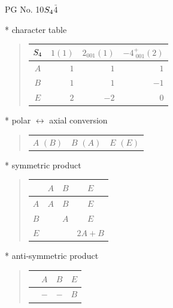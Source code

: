 \documentclass[fleqn,8pt,landscape]{jsarticle}
\begin{document}
\setcounter{MaxMatrixCols}{32}

\renewcommand{\tablename}{Table~}
\renewcommand{\figurename}{Figure~}
\begin{center}
\LARGE
PG No. 10\quad$S_{\rm 4}$\quad$\bar{4}$\quad[ tetragonal ]
\end{center}

* character table
\begin{quote}
\begin{tabular}{crrr} \hline \hline
$ S_{\rm 4} $ & $ 1(1) $ & $ 2{}_{001}(1) $ & $ -4^{+}_{\,\,001}(2) $ \\ \hline
$ A $ & $ 1 $ & $ 1 $ & $ 1 $ \\
$ B $ & $ 1 $ & $ 1 $ & $ -1 $ \\
$ E $ & $ 2 $ & $ -2 $ & $ 0 $ \\
 \hline \hline
\end{tabular}
\end{quote}

* polar $\leftrightarrow$ axial conversion
\begin{quote}
\begin{tabular}{ccc}
$ A\,\,(B) $ & $ B\,\,(A) $ & $ E\,\,(E) $
\end{tabular}
\end{quote}

* symmetric product
\begin{quote}
\begin{tabular}{c|ccc} \hline \hline
 & $ A $ & $ B $ & $ E $ \\ \hline
$ A $ & $ A $ & $ B $ & $ E $ \\
$ B $ & $  $ & $ A $ & $ E $ \\
$ E $ & $  $ & $  $ & $ 2 A + B $ \\
 \hline \hline
\end{tabular}
\end{quote}

* anti-symmetric product
\begin{quote}
\begin{tabular}{cccc} \hline \hline
 & $ A $ & $ B $ & $ E $ \\ \hline
$  $ & $ - $ & $ - $ & $ B $ \\
 \hline \hline
\end{tabular}
\end{quote}
\end{document}
